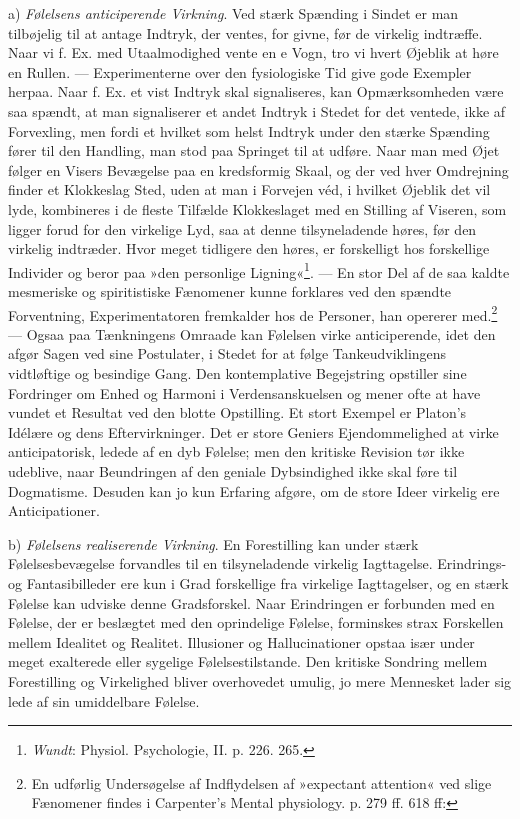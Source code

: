 \documentclass[12pt,a4paper,openany]{book}
\newcommand{\opage}[1]{\marginnote{\footnotesize\textit{[#1]}}}
\begin{document}
a) \emph{Følelsens anticiperende Virkning}. Ved stærk Spænding i Sindet
er man tilbøjelig til at antage Indtryk, der ventes, for givne, før de
virkelig indtræffe. Naar vi f. Ex. med Utaalmodighed vente en e Vogn,
tro vi hvert Øjeblik at høre en Rullen. --- Experimenterne over den
fysiologiske Tid give gode Exempler herpaa. Naar f. Ex. et vist Indtryk
skal signaliseres, kan Opmærksomheden være saa spændt, at man
signaliserer et andet Indtryk i Stedet for det ventede, ikke af
Forvexling, men fordi et hvilket som helst Indtryk under den stærke
Spænding fører til den Handling, man stod paa Springet til at udføre.
Naar man med Øjet følger en Visers Bevægelse
\opage{359}paa en kredsformig Skaal, og der ved hver Omdrejning finder
et Klokkeslag Sted, uden at man i Forvejen véd, i hvilket Øjeblik det
vil lyde, kombineres i de fleste Tilfælde Klokkeslaget med en Stilling
af Viseren, som ligger forud for den virkelige Lyd, saa at denne
tilsyneladende høres, før den virkelig indtræder. Hvor meget tidligere
den høres, er forskelligt hos forskellige Individer og beror paa »den
personlige Ligning«\footnote[1]{\emph{Wundt}: Physiol. Psychologie, II.
p. 226. 265.}. --- En stor Del af de saa kaldte mesmeriske og
spiritistiske Fænomener kunne forklares ved den spændte Forventning,
Experimentatoren fremkalder hos de Personer, han opererer
med.\footnote[2]{En udførlig Undersøgelse af Indflydelsen af »expectant
attention« ved slige Fænomener findes i Carpenter’s Mental physiology.
p. 279 ff. 618 ff:} --- Ogsaa paa Tænkningens Omraade kan Følelsen virke
anticiperende, idet den afgør Sagen ved sine Postulater, i Stedet for at
følge Tankeudviklingens vidtløftige og besindige Gang. Den kontemplative
Begejstring opstiller sine Fordringer om Enhed og Harmoni i
Verdensanskuelsen og mener ofte at have vundet et Resultat ved den
blotte Opstilling. Et stort Exempel er Platon’s Idélære og dens
Eftervirkninger. Det er store Geniers Ejendommelighed at virke
anticipatorisk, ledede af en dyb Følelse; men den kritiske Revision tør
ikke udeblive, naar Beundringen af den geniale Dybsindighed ikke skal
føre til Dogmatisme. Desuden kan jo kun Erfaring afgøre, om de store
Ideer virkelig ere Anticipationer.

b) \emph{Følelsens realiserende Virkning}. En Forestilling kan under
stærk Følelsesbevægelse forvandles til en tilsyneladende virkelig
Iagttagelse. Erindrings- og Fantasibilleder ere kun i Grad forskellige
fra virkelige Iagttagelser, og en stærk Følelse kan udviske denne
Gradsforskel. Naar Erindringen er forbunden med en Følelse, der er
beslægtet med den oprindelige Følelse, forminskes strax Forskellen
mellem Idealitet og Realitet. Illusioner og Hallucinationer opstaa især
under meget exalterede eller sygelige Følelsestilstande. Den kritiske
Sondring mellem Forestilling og Virkelighed bliver overhovedet umulig,
jo mere Mennesket lader sig lede af sin umiddelbare Følelse.
\end{document}
